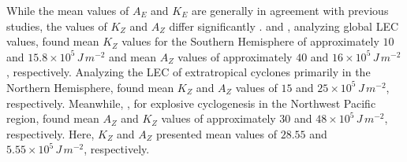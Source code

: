 While the mean values of $A_E$ and $K_E$ are generally in agreement with previous studies, the values of $K_Z$ and $A_Z$ differ significantly \citep[e.g.,]{michaelides1999quasi,veiga2008analysis,dias2011energy,pezza2014large}. \citet{li2007lorenz} and \citet{veiga2013global}, analyzing global LEC values, found mean $K_Z$ values for the Southern Hemisphere of approximately $10$ and $15.8 \times 10^5 \, J \, m^{-2}$ and mean $A_Z$ values of approximately $40$ and $16 \times 10^5 \, J \, m^{-2}$, respectively. Analyzing the LEC of extratropical cyclones primarily in the Northern Hemisphere, \citet{smith1980energetics} found mean $K_Z$ and $A_Z$ values of $15$ and $25 \times 10^5 \, J \, m^{-2}$, respectively. Meanwhile, \citet{black2013universal}, for explosive cyclogenesis in the Northwest Pacific region, found mean $A_Z$ and $K_Z$ values of approximately $30$ and $48 \times 10^5 \, J \, m^{-2}$, respectively. Here, $K_Z$ and $A_Z$ presented mean values of $28.55$ and $5.55 \times 10^5 \, J \, m^{-2}$, respectively.


